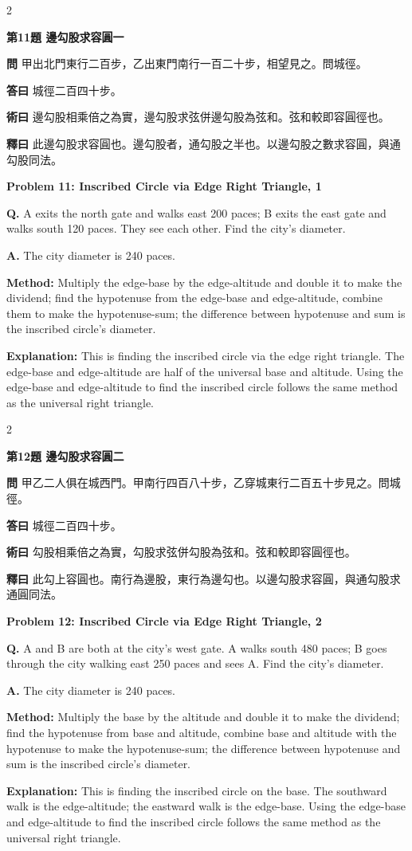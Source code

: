 \documentclass[11pt,a4paper]{article}
\newcommand{\wen}[1]{\noindent\textbf{問} #1\par\smallskip}
\newcommand{\da}[1]{\noindent\textbf{答曰} #1\par\smallskip}
\newcommand{\shu}[1]{\noindent\textbf{術曰} #1\par\smallskip}
\newcommand{\shi}[1]{\noindent\textbf{釋曰} #1\par\smallskip}
\newcommand{\wenE}[1]{\noindent\textbf{Q.} #1\par\smallskip}
\newcommand{\daE}[1]{\noindent\textbf{A.} #1\par\smallskip}
\newcommand{\shuE}[1]{\noindent\textbf{Method:} #1\par\smallskip}
\newcommand{\shiE}[1]{\noindent\textbf{Explanation:} #1\par\smallskip}
\begin{document}
\bigskip

\begin{paracol}{2}

\noindent\textbf{第11題 邊勾股求容圓一}

\wen{甲出北門東行二百步，乙出東門南行一百二十步，相望見之。問城徑。}
\da{城徑二百四十步。}
\shu{邊勾股相乘倍之為實，邊勾股求弦併邊勾股為弦和。弦和較即容圓徑也。}
\shi{此邊勾股求容圓也。邊勾股者，通勾股之半也。以邊勾股之數求容圓，與通勾股同法。}

\switchcolumn

\noindent\textbf{Problem 11: Inscribed Circle via Edge Right Triangle, 1}

\wenE{A exits the north gate and walks east 200 paces; B exits the east gate and walks south 120 paces. They see each other. Find the city's diameter.}
\daE{The city diameter is 240 paces.}
\shuE{Multiply the edge-base by the edge-altitude and double it to make the dividend; find the hypotenuse from the edge-base and edge-altitude, combine them to make the hypotenuse-sum; the difference between hypotenuse and sum is the inscribed circle's diameter.}
\shiE{This is finding the inscribed circle via the edge right triangle. The edge-base and edge-altitude are half of the universal base and altitude. Using the edge-base and edge-altitude to find the inscribed circle follows the same method as the universal right triangle.}

\end{paracol}

\bigskip

\begin{paracol}{2}

\noindent\textbf{第12題 邊勾股求容圓二}

\wen{甲乙二人俱在城西門。甲南行四百八十步，乙穿城東行二百五十步見之。問城徑。}
\da{城徑二百四十步。}
\shu{勾股相乘倍之為實，勾股求弦併勾股為弦和。弦和較即容圓徑也。}
\shi{此勾上容圓也。南行為邊股，東行為邊勾也。以邊勾股求容圓，與通勾股求通圓同法。}

\switchcolumn

\noindent\textbf{Problem 12: Inscribed Circle via Edge Right Triangle, 2}

\wenE{A and B are both at the city's west gate. A walks south 480 paces; B goes through the city walking east 250 paces and sees A. Find the city's diameter.}
\daE{The city diameter is 240 paces.}
\shuE{Multiply the base by the altitude and double it to make the dividend; find the hypotenuse from base and altitude, combine base and altitude with the hypotenuse to make the hypotenuse-sum; the difference between hypotenuse and sum is the inscribed circle's diameter.}
\shiE{This is finding the inscribed circle on the base. The southward walk is the edge-altitude; the eastward walk is the edge-base. Using the edge-base and edge-altitude to find the inscribed circle follows the same method as the universal right triangle.}

\end{paracol}
\end{document}
